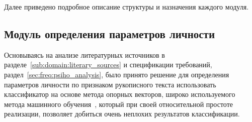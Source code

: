Далее приведено подробное описание структуры и назначения каждого модуля.


\subsection{Модуль определения параметров личности}
\label{sec:architecture:personal_parameters}
Основываясь на анализе литературных источников в разделе~\ref{sub:domain:literary_sources} и спецификации требований, раздел~\ref{sec:freq:psiho_analysis}, было принято решение для определения параметров личности по признаком рукописного текста использовать классификатор на основе метода опорных векторов, широко используемого метода машинного обучения~\cite{manning_ir}, который при своей относительной простоте реализации, позволяет добиться очень неплохих результатов классификации.

